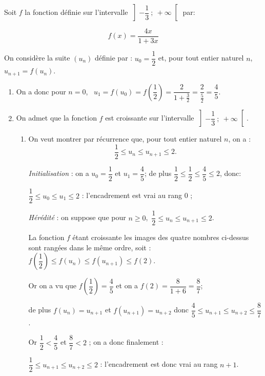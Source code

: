 
\medskip

Soit $f$ la fonction définie sur l'intervalle $\left]-\dfrac{1}{3}~;~+\infty\right[$ par:

\[ f(x) = \dfrac{4x}{1 + 3x}\]

On considère la suite $\left(u_n\right)$ définie par : $u_0 = \dfrac{1}{2}$ et, pour tout entier naturel $n$,\, $u_{n+1} = f\left(u_n\right)$.

\medskip

\begin{enumerate}
\item %
On a donc pour $n = 0$, \, $u_1 = f\left(u_0\right) = f\left(\dfrac{1}{2}\right) = \dfrac{2}{1 + \frac{3}{2}} = \dfrac{2}{\frac{5}{2}} = \dfrac{4}{5}$.
\item On admet que la fonction $f$ est croissante sur l'intervalle $\left]-\dfrac{1}{3}~;~+\infty\right[$.
	\begin{enumerate}
		\item On veut montrer par récurrence que, pour tout entier naturel $n$, on a : 
		\[\dfrac{1}{2} \leqslant u_n \leqslant u_{n+1} \leqslant 2.\]
		
		
\emph{Initialisation} : on a $u_0=\dfrac{1}{2}$ et $u_1=\dfrac{4}{5}$; de plus $\dfrac{1}{2} \leqslant \dfrac{1}{2} \leqslant \dfrac{4}{5} \leqslant 2$, donc:
		
$\dfrac{1}{2} \leqslant u_0 \leqslant u_1\leqslant 2$ : l'encadrement est vrai au rang 0 ;

\emph{Hérédité} : on suppose que pour $n \geqslant 0$,\, $\dfrac{1}{2} \leqslant u_n \leqslant u_{n+1} \leqslant 2$.

La fonction $f$ étant croissante les images des quatre nombres ci-dessus sont rangées dans le même ordre, soit :
$f\left(\dfrac{1}{2}\right) \leqslant f\left(u_n\right) \leqslant f\left(u_{n+1}\right) \leqslant f(2)$.

Or on a vu que $f\left(\dfrac{1}{2}\right) = \dfrac{4}{5}$ et on a $f(2) = \dfrac{8}{1 + 6} = \dfrac{8}{7}$;

de plus $f(u_{n})= u_{n+1}$ et $f(u_{n+1})= u_{n+2}$ donc 
$\dfrac{4}{5} \leqslant  u_{n+1} \leqslant u_{n+2} \leqslant \dfrac{8}{7}$.

Or $\dfrac{1}{2} < \dfrac{4}{5}$ et $\dfrac{8}{7} < 2$ ; on a donc finalement :

$\dfrac{1}{2} \leqslant  u_{n+1} \leqslant u_{n+2} \leqslant 2$ : l'encadrement est donc vrai au rang $n + 1$.


\end{enumerate}
\end{enumerate}
